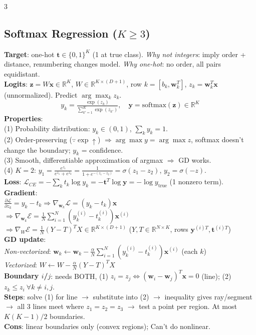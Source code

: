 \documentclass[10pt]{article}
\newcommand{\vx}{\mathbf{x}}
\newcommand{\vw}{\mathbf{w}}
\newcommand{\vt}{\mathbf{t}}
\newcommand{\cE}{\mathcal{E}}
\newcommand{\cL}{\mathcal{L}}
\newcommand{\sub}[1]{\textit{#1}:}  %
\begin{document}
\begin{multicols*}{3}
\subsection{Softmax Regression ($K\ge3$)}
\textbf{Target}: one-hot $\vt\in\{0,1\}^K$ (1 at true class). \sub{Why not integers} imply order + distance, renumbering changes model. \sub{Why one-hot} no order, all pairs equidistant.\\
\textbf{Logits}: $\mathbf z=W\vx\in\mathbb R^K$, $W\in\mathbb R^{K\times(D+1)}$, row $k=[b_k,\vw_k^T]$, $z_k=\vw_k^T\vx$ (unnormalized). Predict $\arg\max_k z_k$.
\[ y_k=\tfrac{\exp(z_k)}{\sum_{k'=1}^K\exp(z_{k'})},\quad \mathbf{y}=\text{softmax}(\mathbf z)\in\mathbb R^K \]
\textbf{Properties}:\\
(1) Probability distribution: $y_k\in(0,1)$, $\sum_k y_k=1$.\\
(2) Order-preserving ($\because\exp\uparrow$) $\Rightarrow\arg\max y=\arg\max z$, softmax doesn't change the boundary; $y_k$ = confidence.\\
(3) Smooth, differentiable approximation of argmax $\Rightarrow$ GD works.\\
(4) $K=2$: $y_1=\frac{e^{z_1}}{e^{z_1}+e^{z_2}}=\frac{1}{1+e^{-(z_1-z_2)}}=\sigma(z_1\!-\!z_2)$, $y_2=\sigma(-z)$.\\
\textbf{Loss}: $\cL_{CE}=-\sum_k t_k\log y_k=-\vt^T\log\mathbf{y}=-\log y_{\text{true}}$ (1 nonzero term).\\
\textbf{Gradient}:\\
$\frac{\partial\cL}{\partial z_k}=y_k-t_k\Rightarrow\nabla_{\vw_k}\cL=(y_k-t_k)\vx$\\
$\Rightarrow\nabla_{\vw_k}\cE=\frac1N\sum_{i=1}^N(y_k^{(i)}-t_k^{(i)})\vx^{(i)}$\\
$\Rightarrow\nabla_W\cE=\frac1N(Y-T)^TX\in\mathbb R^{K\times(D+1)}$ ($Y,T\in\mathbb R^{N\times K}$, rows $\mathbf{y}^{(i)T},\vt^{(i)T}$)\\
\textbf{GD update}:\\
\sub{Non-vectorized} $\vw_k\leftarrow\vw_k-\frac{\alpha}{N}\sum_{i=1}^N(y_k^{(i)}-t_k^{(i)})\vx^{(i)}$ (each $k$)\\
\sub{Vectorized} $W\leftarrow W-\frac{\alpha}{N}(Y-T)^TX$\\
\textbf{Boundary $i$/$j$}: needs BOTH, (1) $z_i=z_j\iff(\vw_i-\vw_j)^T\vx=0$ (line); (2) $z_k\le z_i\ \forall k\ne i,j$.\\
\textbf{Steps}: solve (1) for line $\to$ substitute into (2) $\to$ inequality gives ray/segment $\to$ all 3 lines meet where $z_1=z_2=z_3$ $\to$ test a point per region. At most $K(K\!-\!1)/2$ boundaries.\\
\textbf{Cons}: linear boundaries only (convex regions); Can't do nonlinear.

\end{multicols*}
\end{document}
